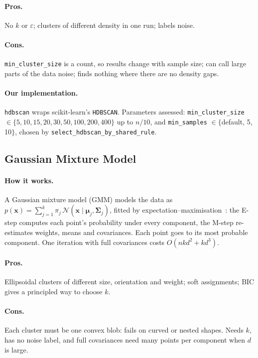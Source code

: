 \paragraph{Pros.} No $k$ or $\varepsilon$; clusters of different density in one run; labels noise.
\paragraph{Cons.} \texttt{min\_cluster\_size} is a count, so results change with sample size; can call
large parts of the data noise; finds nothing where there are no density gaps.
\paragraph{Our implementation.} \texttt{hdbscan} wraps scikit-learn's \texttt{HDBSCAN}. Parameters
assessed: \texttt{min\_cluster\_size} $\in\{5,10,15,20,30,50,100,200,400\}$ up to $n/10$, and
\texttt{min\_samples} $\in\{$default, 5, 10$\}$, chosen by \texttt{select\_hdbscan\_by\_shared\_rule}.

\subsection{Gaussian Mixture Model}
\paragraph{How it works.} A Gaussian mixture model (GMM) models the data as
$p(\mathbf{x})=\sum_{j=1}^{k}\pi_j\,\mathcal{N}(\mathbf{x}\mid\boldsymbol{\mu}_j,\boldsymbol{\Sigma}_j)$,
fitted by expectation--maximisation~\cite{dempster1977}: the E-step computes each point's probability
under every component, the M-step re-estimates weights, means and covariances. Each point goes to its most
probable component. One iteration with full covariances costs $O(nkd^2+kd^3)$.
\paragraph{Pros.} Ellipsoidal clusters of different size, orientation and weight; soft assignments; BIC
gives a principled way to choose $k$.
\paragraph{Cons.} Each cluster must be one convex blob: fails on curved or nested shapes. Needs $k$, has
no noise label, and full covariances need many points per component when $d$ is large.

